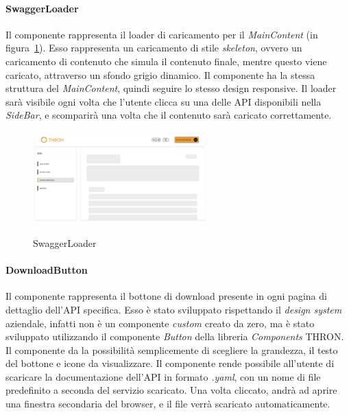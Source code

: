 \paragraph{SwaggerLoader}\label{par:swagger-loader}
Il componente rappresenta il loader di caricamento per il \textit{MainContent} (in figura~\ref{fig:swagger-loader}). 
Esso rappresenta un caricamento di stile \textit{skeleton}, ovvero un caricamento di contenuto che simula il contenuto finale, mentre questo viene caricato, attraverso un sfondo grigio dinamico.
Il componente ha la stessa struttura del \textit{MainContent}, quindi seguire lo stesso design responsive.
Il loader sarà visibile ogni volta che l'utente clicca su una delle API disponibili nella \textit{SideBar}, e scomparirà una volta che il contenuto sarà caricato correttamente.

\begin{figure}[ht]
  \centering
  \includegraphics[width=0.6\textwidth, alt={Skeleton loader di caricamento per contenuto principale}]{images/frontend/SwaggerLoader.jpg}
  \caption{SwaggerLoader}\label{fig:swagger-loader}
\end{figure}

\pagebreak
\paragraph{DownloadButton}\label{par:download-button}
Il componente rappresenta il bottone di download presente in ogni pagina di dettaglio dell'API specifica. Esso è stato sviluppato rispettando il \textit{design system}
aziendale, infatti non è un componente \textit{custom} creato da zero, ma è stato sviluppato utilizzando il componente \textit{Button} della libreria \textit{Components} THRON.
Il componente da la possibilità semplicemente di scegliere la grandezza, il testo del bottone e icone da visualizzare.
Il componente rende possibile all'utente di scaricare la documentazione dell'API in formato \textit{.yaml}, con un nome di file predefinito a seconda 
del servizio scaricato. Una volta cliccato, andrà ad aprire una finestra secondaria del browser, e il file verrà scaricato automaticamente.\\

